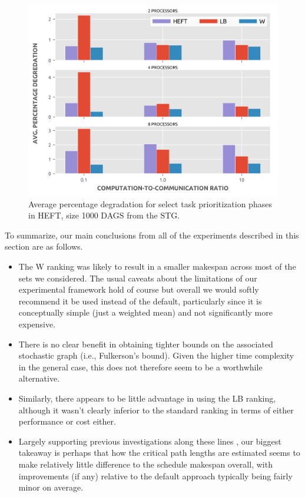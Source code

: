 \documentclass[12pt]{article}
\begin{document}
\begin{figure}
	\centering	
	\includegraphics[scale=0.8]{1000tasks_apd.png}
	\caption{Average percentage degradation for select task prioritization phases in HEFT, size 1000 DAGS from the STG.}	
	\label{plot.rankings_apd_1000}
\end{figure}

To summarize, our main conclusions from all of the experiments described in this section are as follows.
\begin{itemize}
	\item The W ranking was likely to result in a smaller makespan across most of the sets we considered. The usual caveats about the limitations of our experimental framework hold of course but overall we would softly recommend it be used instead of the default, particularly since it is conceptually simple (just a weighted mean) and not significantly more expensive.
	\item There is no clear benefit in obtaining tighter bounds on the associated stochastic graph (i.e., Fulkerson's bound). Given the higher time complexity in the general case, this does not therefore seem to be a worthwhile alternative.    
	\item Similarly, there appears to be little advantage in using the LB ranking, although it wasn't clearly inferior to the standard ranking in terms of either performance or cost either.
	\item Largely supporting previous investigations along these lines \cite{zhao03}, our biggest takeaway is perhaps that how the critical path lengths are estimated seems to make relatively little difference to the schedule makespan overall, with improvements (if any) relative to the default approach typically being fairly minor on average.   
\end{itemize} 
\end{document}
